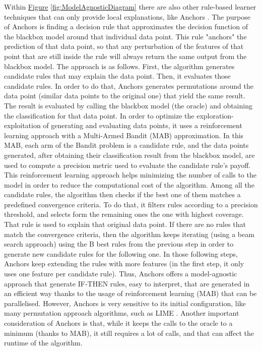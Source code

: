 Within \hyperref[fig:ModelAgnosticDiagram]{Figure} \ref{fig:ModelAgnosticDiagram} there are also other rule-based learner techniques that can only provide local explanations, like Anchors \parencite{ribeiro2018anchors}. The purpose of Anchors is finding a decision rule that approximates the decision function of the blackbox model around that individual data point. This rule "anchors" the prediction of that data point, so that any perturbation of the features of that point that are still inside the rule will always return the same output from the blackbox model. The approach is as follows. First, the algorithm generates candidate rules that may explain the data point. Then, it evaluates those candidate rules. In order to do that, Anchors generates permutations around the data point (similar data points to the original one) that yield the same result. The result is evaluated by calling the blackbox model (the oracle) and obtaining the classification for that data point. In order to optimize the exploration-exploitation of generating and evaluating data points, it uses a reinforcement learning approach with a Multi-Armed Bandit (MAB) approximation. In this MAB, each arm of the Bandit problem is a candidate rule, and the data points generated, after obtaining their classification result from the blackbox model, are used to compute a precision metric used to evaluate the candidate rule's payoff. This reinforcement learning approach helps minimizing the number of calls to the model in order to reduce the computational cost of the algorithm. Among all the candidate rules, the algorithm then checks if the best one of them matches a predefined convergence criteria. To do that, it filters rules according to a precision threshold, and selects form the remaining ones the one with highest coverage. That rule is used to explain that original data point. If there are no rules that match the convergence criteria, then the algorithm keeps iterating (using a beam search approach) using the B best rules from the previous step in order to generate new candidate rules for the following one. In those following steps, Anchors keep extending the rules with more features (in the first step, it only uses one feature per candidate rule).
Thus, Anchors offers a model-agnostic approach that generate IF-THEN rules, easy to interpret, that are generated in an efficient way thanks to the usage of reinforcement learning (MAB) that can be parallelised. However, Anchors is very sensitive to its initial configuration, like many permutation approach algorithms, such as LIME \parencite{ribeiro2016should}. Another important consideration of Anchors is that, while it keeps the calls to the oracle to a minimum (thanks to MAB), it still requires a lot of calls, and that can affect the runtime of the algorithm.

